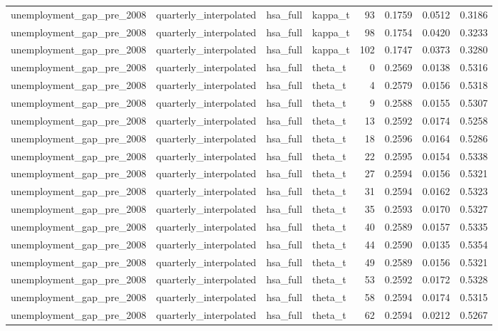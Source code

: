 \begin{tabular}{llllrrrr}
unemployment\_gap\_pre\_2008 & quarterly\_interpolated & hsa\_full & kappa\_t & 93 & 0.1759 & 0.0512 & 0.3186 \\
unemployment\_gap\_pre\_2008 & quarterly\_interpolated & hsa\_full & kappa\_t & 98 & 0.1754 & 0.0420 & 0.3233 \\
unemployment\_gap\_pre\_2008 & quarterly\_interpolated & hsa\_full & kappa\_t & 102 & 0.1747 & 0.0373 & 0.3280 \\
unemployment\_gap\_pre\_2008 & quarterly\_interpolated & hsa\_full & theta\_t & 0 & 0.2569 & 0.0138 & 0.5316 \\
unemployment\_gap\_pre\_2008 & quarterly\_interpolated & hsa\_full & theta\_t & 4 & 0.2579 & 0.0156 & 0.5318 \\
unemployment\_gap\_pre\_2008 & quarterly\_interpolated & hsa\_full & theta\_t & 9 & 0.2588 & 0.0155 & 0.5307 \\
unemployment\_gap\_pre\_2008 & quarterly\_interpolated & hsa\_full & theta\_t & 13 & 0.2592 & 0.0174 & 0.5258 \\
unemployment\_gap\_pre\_2008 & quarterly\_interpolated & hsa\_full & theta\_t & 18 & 0.2596 & 0.0164 & 0.5286 \\
unemployment\_gap\_pre\_2008 & quarterly\_interpolated & hsa\_full & theta\_t & 22 & 0.2595 & 0.0154 & 0.5338 \\
unemployment\_gap\_pre\_2008 & quarterly\_interpolated & hsa\_full & theta\_t & 27 & 0.2594 & 0.0156 & 0.5321 \\
unemployment\_gap\_pre\_2008 & quarterly\_interpolated & hsa\_full & theta\_t & 31 & 0.2594 & 0.0162 & 0.5323 \\
unemployment\_gap\_pre\_2008 & quarterly\_interpolated & hsa\_full & theta\_t & 35 & 0.2593 & 0.0170 & 0.5327 \\
unemployment\_gap\_pre\_2008 & quarterly\_interpolated & hsa\_full & theta\_t & 40 & 0.2589 & 0.0157 & 0.5335 \\
unemployment\_gap\_pre\_2008 & quarterly\_interpolated & hsa\_full & theta\_t & 44 & 0.2590 & 0.0135 & 0.5354 \\
unemployment\_gap\_pre\_2008 & quarterly\_interpolated & hsa\_full & theta\_t & 49 & 0.2589 & 0.0156 & 0.5321 \\
unemployment\_gap\_pre\_2008 & quarterly\_interpolated & hsa\_full & theta\_t & 53 & 0.2592 & 0.0172 & 0.5328 \\
unemployment\_gap\_pre\_2008 & quarterly\_interpolated & hsa\_full & theta\_t & 58 & 0.2594 & 0.0174 & 0.5315 \\
unemployment\_gap\_pre\_2008 & quarterly\_interpolated & hsa\_full & theta\_t & 62 & 0.2594 & 0.0212 & 0.5267 \\

\end{tabular}
